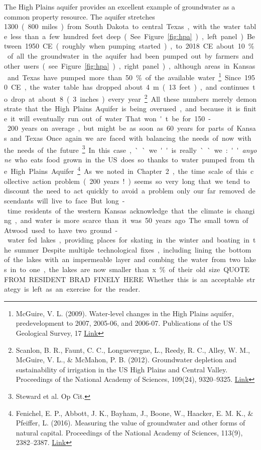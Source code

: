 \documentclass[amstex,12pt]{book}
\begin{document}
The High Plains aquifer provides an excellent example of groundwater as a common property resource. The aquifer stretches \SI{1300}[{\kilo}{\metre}] (800 miles) from South Dakota to central Texas, with the water table less than a few hundred feet deep (See Figure \ref{fig:hpa}), left panel). Between 1950 CE (roughly when pumping started), to 2018 CE about 10\% of all the groundwater in the aquifer had been pumped out by farmers and other users (see Figure \ref{fig:hpa}), right panel), although areas in Kansas and Texas have pumped more than 50\% of the available water\footnote{McGuire, V. L. (2009). Water-level changes in the High Plains aquifer, predevelopment to 2007, 2005-06, and 2006-07. Publications of the US Geological Survey, 17  \href{http://digitalcommons.unl.edu/usgspubs/17}{Link}}. Since 1950 CE, the water table has dropped about \SI{4}{\metre} (13 feet), and continues to drop at about \SI{8}[{\centi}{\metre}] (3 inches) every year\footnote{Scanlon, B. R., Faunt, C. C., Longuevergne, L., Reedy, R. C., Alley, W. M., McGuire, V. L., \& McMahon, P. B. (2012). Groundwater depletion and sustainability of irrigation in the US High Plains and Central Valley. Proceedings of the National Academy of Sciences, 109(24), 9320–9325. \href{https://doi.org/10.1073/pnas.1200311109}{Link}}. All these numbers merely demonstrate that the High Plains Aquifer is being overused, and because it is finite it will eventually run out of water. That won't be for 150-200 years on average, but might be as soon as 60 years for parts of Kansas and Texas. Once again we are faced with balancing the needs of now with the needs of the future\footnote{Steward et al. Op Cit.}.In this case, ``we'' is really ``we:'' \emph{anyone} who eats food grown in the US does so thanks to water pumped from the High Plains Aquifer\footnote{Fenichel, E. P., Abbott, J. K., Bayham, J., Boone, W., Haacker, E. M. K., \& Pfeiffer, L. (2016). Measuring the value of groundwater and other forms of natural capital. Proceedings of the National Academy of Sciences, 113(9), 2382–2387. \href{https://doi.org/10.1073/pnas.1513779113}{Link}}.
As we noted in Chapter 2, the time scale of this collective action problem (200 years!) seems so very long that we tend to discount the need to act quickly to avoid a problem only our far removed descendants will live to face. But long-time residents of the western Kansas acknowledge that the climate is changing, and water is more scarce than it was 50 years ago. The small town of Atwood used to have two ground-water fed lakes, providing places for skating in the winter and boating in the summer. Despite multiple technological fixes, including lining the bottom of the lakes with an impermeable layer and combing the water from two lakes in to one, the lakes are now smaller than x\% of their old size. QUOTE FROM RESIDENT BRAD FINELY HERE. Whether this is an acceptable strategy is left as an exercise for the reader.    
\end{document}
